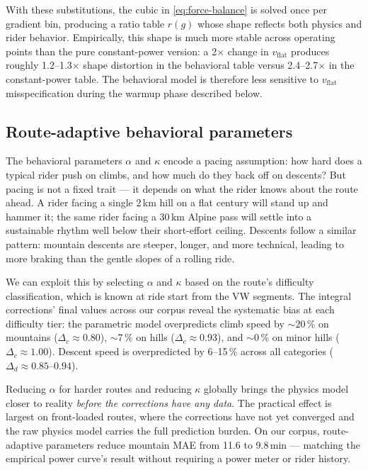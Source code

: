 \documentclass[11pt,a4paper]{article}
\begin{document}
With these substitutions, the cubic in \eqref{eq:force-balance} is
solved once per gradient bin, producing a ratio table $r(g)$ whose
shape reflects both physics and rider behavior. Empirically, this
shape is much more stable across operating points than the pure
constant-power version: a 2$\times$ change in $v_{\text{flat}}$
produces roughly 1.2--1.3$\times$ shape distortion in the behavioral
table versus 2.4--2.7$\times$ in the constant-power table. The
behavioral model is therefore less sensitive to $v_{\text{flat}}$
misspecification during the warmup phase described below.

\subsection{Route-adaptive behavioral parameters}
\label{sec:route-adaptive}

The behavioral parameters $\alpha$ and $\kappa$ encode a pacing
assumption: how hard does a typical rider push on climbs, and how much
do they back off on descents? But pacing is not a fixed trait --- it
depends on what the rider knows about the route ahead. A rider facing
a single 2\,\si{\km} hill on a flat century will stand up and hammer
it; the same rider facing a 30\,\si{\km} Alpine pass will settle into
a sustainable rhythm well below their short-effort ceiling. Descents
follow a similar pattern: mountain descents are steeper, longer, and
more technical, leading to more braking than the gentle slopes of a
rolling ride.

We can exploit this by selecting $\alpha$ and $\kappa$ based on the
route's difficulty classification, which is known at ride start from
the VW segments. The integral corrections' final values across our
corpus reveal the systematic bias at each difficulty tier: the
parametric model overpredicts climb speed by $\sim$20\,\% on
mountains ($\Delta_c \approx 0.80$), $\sim$7\,\% on hills
($\Delta_c \approx 0.93$), and $\sim$0\,\% on minor hills
($\Delta_c \approx 1.00$). Descent speed is overpredicted by
6--15\,\% across all categories ($\Delta_d \approx 0.85$--$0.94$).

Reducing $\alpha$ for harder routes and reducing $\kappa$ globally
brings the physics model closer to reality \emph{before the
corrections have any data}. The practical effect is largest on
front-loaded routes, where the corrections have not yet converged and
the raw physics model carries the full prediction burden. On our
corpus, route-adaptive parameters reduce mountain MAE from
11.6 to 9.8\,\si{\minute} --- matching the empirical power curve's
result without requiring a power meter or rider history.
\end{document}
